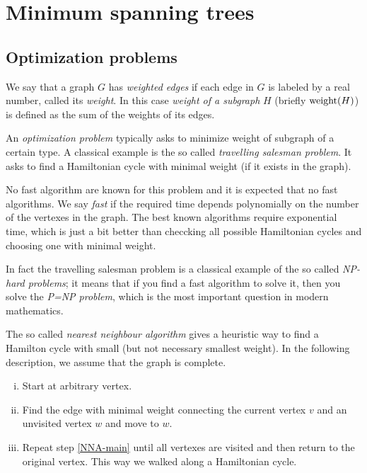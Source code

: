 \chapter{Minimum spanning trees}


\section*{Optimization problems}

We say that a graph $G$ has \emph{weighted edges} if each edge in $G$ is labeled by a real number, called its \emph{weight}.
In this case \emph{weight of a subgraph} $H$ (briefly $\mathop{\rm weight}\nolimits(H)$) is defined as the sum of the weights of its edges.

An {}\emph{optimization problem} typically asks to minimize weight of subgraph of a certain type.
A classical example is the so called \emph{travelling salesman problem}.
It asks to find a Hamiltonian cycle with minimal weight (if it exists in the graph).

No fast algorithm are known for this problem and it is expected that no fast algorithms.
We say {}\emph{fast} if the required time depends polynomially on the number of the vertexes in the graph.
The best known algorithms require exponential time, which is just a bit better than checcking all possible Hamiltonian cycles and choosing one with minimal weight.

In fact the travelling salesman problem is a classical example of the so called {}\emph{NP-hard problems}; it means that if you find a fast algorithm to solve it, then you solve the \emph{P=NP problem}, which is the most important question in modern mathematics.

The so called \emph{nearest neighbour algorithm} gives a heuristic way to find a Hamilton cycle with small (but not necessary smallest weight).
In the following description, we assume that the graph is complete.
\begin{enumerate}[(i)]
\item Start at arbitrary vertex.
\item\label{NNA-main} Find the edge with minimal weight connecting the current vertex $v$ and an unvisited vertex $w$ and move to $w$.
\item Repeat step \ref{NNA-main} until all vertexes are visited and then return to the original vertex.
This way we walked along a Hamiltonian cycle.
\end{enumerate}


